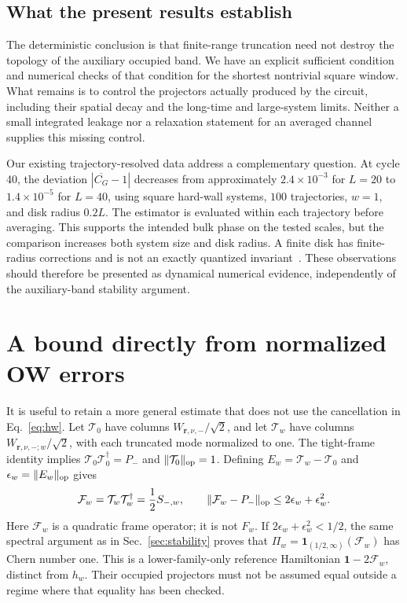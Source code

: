 \documentclass[aps,prb,onecolumn,nofootinbib,superscriptaddress]{revtex4-2}
\newcommand{\id}{\mathbf{1}}
\newcommand{\br}{\boldsymbol r}
\begin{document}
\subsection{What the present results establish}

The deterministic conclusion is that finite-range truncation need not
destroy the topology of the auxiliary occupied band. We have an explicit
sufficient condition and numerical checks of that condition for the shortest
nontrivial square window. What remains is to control the projectors actually
produced by the circuit, including their spatial decay and the long-time and
large-system limits. Neither a small integrated leakage nor a relaxation
statement for an averaged channel supplies this missing control.

Our existing trajectory-resolved data address a complementary question.
At cycle 40, the deviation $|\overline{C_G}-1|$ decreases from approximately
$2.4\times10^{-3}$ for $L=20$ to $1.4\times10^{-5}$ for $L=40$, using
square hard-wall systems, $100$ trajectories, $w=1$, and disk radius $0.2L$.
The estimator is evaluated within each trajectory before averaging. This
supports the intended bulk phase on the tested scales, but the comparison
increases both system size and disk radius. A finite disk has finite-radius
corrections and is not an exactly quantized invariant~\cite{Kitaev2006}.
These observations should therefore be presented as dynamical numerical
evidence, independently of the auxiliary-band stability argument.

\appendix
\section{A bound directly from normalized OW errors}
\label{app:synthesis}

It is useful to retain a more general estimate that does not use the
cancellation in Eq.~\eqref{eq:hw}. Let $\mathcal T_0$ have columns
$W_{\br,\nu,-}/\sqrt2$, and let $\mathcal T_w$ have columns
$W_{\br,\nu,-;w}/\sqrt2$, with each truncated mode normalized to one.
The tight-frame identity implies
$\mathcal T_0\mathcal T_0^\dagger=P_-$ and
$\|\mathcal T_0\|_{\rm op}=1$. Defining
$E_w=\mathcal T_w-\mathcal T_0$ and
$\epsilon_w=\|E_w\|_{\rm op}$ gives
\begin{equation}
 \mathcal F_w=\mathcal T_w\mathcal T_w^\dagger=\frac12S_{-,w},\qquad
 \|\mathcal F_w-P_-\|_{\rm op}
 \le2\epsilon_w+\epsilon_w^2.
 \label{eq:synthesis}
\end{equation}
Here $\mathcal F_w$ is a quadratic frame operator; it is not $F_w$.
If $2\epsilon_w+\epsilon_w^2<1/2$, the same spectral argument as in
Sec.~\ref{sec:stability} proves that
$\Pi_w=\mathbf{1}_{(1/2,\infty)}(\mathcal F_w)$ has Chern number one.
This is a lower-family-only reference Hamiltonian
$\id-2\mathcal F_w$, distinct from $h_w$. Their occupied projectors must
not be assumed equal outside a regime where that equality has been checked.
\end{document}
